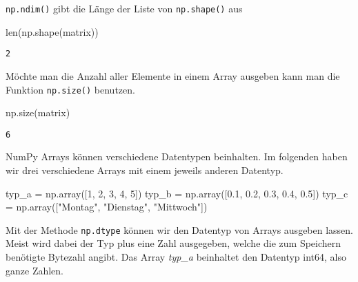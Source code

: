 \documentclass[
  letterpaper,
  DIV=11,
  numbers=noendperiod]{scrreprt}
\newenvironment{Shaded}{\begin{snugshade}}{\end{snugshade}}
\newcommand{\BuiltInTok}[1]{\textcolor[rgb]{0.00,0.23,0.31}{#1}}
\newcommand{\DecValTok}[1]{\textcolor[rgb]{0.68,0.00,0.00}{#1}}
\newcommand{\FloatTok}[1]{\textcolor[rgb]{0.68,0.00,0.00}{#1}}
\newcommand{\NormalTok}[1]{\textcolor[rgb]{0.00,0.23,0.31}{#1}}
\newcommand{\OperatorTok}[1]{\textcolor[rgb]{0.37,0.37,0.37}{#1}}
\newcommand{\StringTok}[1]{\textcolor[rgb]{0.13,0.47,0.30}{#1}}
\begin{document}
\begin{tcolorbox}
\begin{tcolorbox}
\texttt{np.ndim()} gibt die Länge der Liste von \texttt{np.shape()} aus

\begin{Shaded}
\begin{Highlighting}[]
\BuiltInTok{len}\NormalTok{(np.shape(matrix))}
\end{Highlighting}
\end{Shaded}

\begin{verbatim}
2
\end{verbatim}

\end{tcolorbox}

Möchte man die Anzahl aller Elemente in einem Array ausgeben kann man
die Funktion \texttt{np.size()} benutzen.

\begin{Shaded}
\begin{Highlighting}[]
\NormalTok{np.size(matrix)}
\end{Highlighting}
\end{Shaded}

\begin{verbatim}
6
\end{verbatim}

NumPy Arrays können verschiedene Datentypen beinhalten. Im folgenden
haben wir drei verschiedene Arrays mit einem jeweils anderen Datentyp.

\begin{Shaded}
\begin{Highlighting}[]
\NormalTok{typ\_a }\OperatorTok{=}\NormalTok{ np.array([}\DecValTok{1}\NormalTok{, }\DecValTok{2}\NormalTok{, }\DecValTok{3}\NormalTok{, }\DecValTok{4}\NormalTok{, }\DecValTok{5}\NormalTok{])}
\NormalTok{typ\_b }\OperatorTok{=}\NormalTok{ np.array([}\FloatTok{0.1}\NormalTok{, }\FloatTok{0.2}\NormalTok{, }\FloatTok{0.3}\NormalTok{, }\FloatTok{0.4}\NormalTok{, }\FloatTok{0.5}\NormalTok{])}
\NormalTok{typ\_c }\OperatorTok{=}\NormalTok{ np.array([}\StringTok{"Montag"}\NormalTok{, }\StringTok{"Dienstag"}\NormalTok{, }\StringTok{"Mittwoch"}\NormalTok{])}
\end{Highlighting}
\end{Shaded}

Mit der Methode \texttt{np.dtype} können wir den Datentyp von Arrays
ausgeben lassen. Meist wird dabei der Typ plus eine Zahl ausgegeben,
welche die zum Speichern benötigte Bytezahl angibt. Das Array
\emph{typ\_a} beinhaltet den Datentyp int64, also ganze Zahlen.


\end{tcolorbox}
\end{document}
